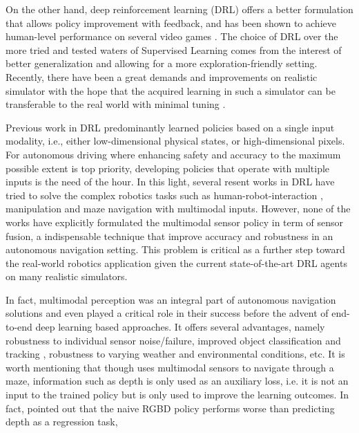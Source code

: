 \documentclass[../thesis.tex]{subfiles}
\begin{document}

On the other hand, deep reinforcement learning (DRL) offers a better formulation that allows policy improvement with feedback, and has been shown to achieve human-level performance on several video games \cite{mnih2013playing, mnih2015human,2016-TOG-deepRL}.
The choice of DRL over the more tried and tested waters of Supervised Learning comes from the interest of better generalization and allowing for a more exploration-friendly setting. 
Recently, there have been a great demands and improvements on realistic simulator \cite{deepdrive,udacity} with the hope that the acquired learning in such a simulator can be transferable to the real world with minimal tuning \cite{you2017virtual}. 


Previous work in DRL predominantly learned policies based on a single input modality, i.e., either low-dimensional physical states, or high-dimensional pixels. 
For autonomous driving where enhancing safety and accuracy to the maximum possible extent is top priority, developing policies that operate with multiple inputs is the need of the hour. 
In this light, several resent works in DRL have tried to solve the complex robotics tasks such as human-robot-interaction \cite{qureshi2016robot}, manipulation \cite{levine2016end} and maze navigation \cite{mirowski2017a} with multimodal inputs. 
However, none of the works have explicitly formulated the multimodal sensor policy in term of sensor fusion, a indispensable technique that improve accuracy and robustness in an autonomous navigation setting. 
This problem is critical as a further step toward the real-world robotics application given the current state-of-the-art DRL agents on many realistic simulators.

In fact, multimodal perception was an integral part of autonomous navigation solutions and even played a critical role in their success \cite{multimodaltartan} before the advent of end-to-end deep learning based approaches. 
It offers several advantages, namely robustness to individual sensor noise/failure, improved object classification and tracking \cite{elfring2016multisensor, cho2014multi, darms2008classification}, robustness to varying weather and environmental conditions, etc. 
It is worth mentioning that though \citet{mirowski2017a} uses multimodal sensors to navigate through a maze, information such as depth is only used as an auxiliary loss, i.e. it is not an input to the trained policy but is only used to improve the learning outcomes. 
In fact, \citet{mirowski2017a} pointed out that the naive RGBD policy performs worse than predicting depth as a regression task,
\end{document}
